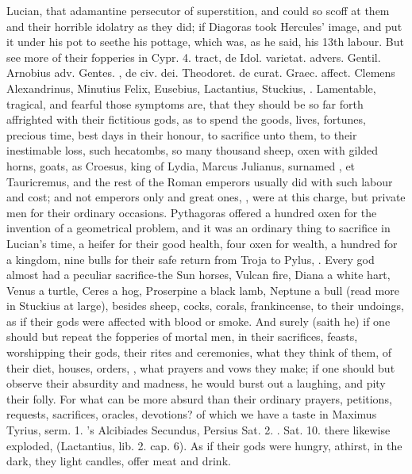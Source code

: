 {Lucian, that adamantine persecutor of superstition, and \Pliny{}
could so scoff at them and their horrible idolatry as they did; if
Diagoras took Hercules' image, and put it under his pot to seethe his
pottage, which was, as he said, his 13th labour. But see more of their
fopperies in Cypr. \textlatin{4. tract, de Idol. varietat}. \Chrysostom{} \textlatin{advers.
Gentil.} Arnobius \textlatin{adv. Gentes.} \Austin{}, \textlatin{de civ. dei. Theodoret. de curat.
Graec. affect.} Clemens Alexandrinus, Minutius Felix, Eusebius,
Lactantius, Stuckius, \etc{}. Lamentable, tragical, and fearful those
symptoms are, that they should be so far forth affrighted with their
fictitious gods, as to spend the goods, lives, fortunes, precious time,
best days in their honour, to sacrifice unto them, to their
inestimable loss, such hecatombs, so many thousand sheep, oxen with
gilded horns, goats, as Croesus, king of Lydia,  Marcus
Julianus, surnamed , et Tauricremus, and
the rest of the Roman emperors usually did with such labour and cost;
and not emperors only and great ones, , were at this
charge, but private men for their ordinary occasions. Pythagoras
offered a hundred oxen for the invention of a geometrical problem, and
it was an ordinary thing to sacrifice in Lucian's time, a heifer
for their good health, four oxen for wealth, a hundred for a kingdom,
nine bulls for their safe return from Troja to Pylus, \etc{}. Every god
almost had a peculiar sacrifice-the Sun horses, Vulcan fire, Diana a
white hart, Venus a turtle, Ceres a hog, Proserpine a black lamb,
Neptune a bull (read more in  Stuckius at large), besides sheep,
cocks, corals, frankincense, to their undoings, as if their gods were
affected with blood or smoke. And surely (saith he) if one should
but repeat the fopperies of mortal men, in their sacrifices, feasts,
worshipping their gods, their rites and ceremonies, what they think of
them, of their diet, houses, orders, \etc{}, what prayers and vows they
make; if one should but observe their absurdity and madness, he would
burst out a laughing, and pity their folly. For what can be more absurd
than their ordinary prayers, petitions, requests, sacrifices,
oracles, devotions? of which we have a taste in Maximus Tyrius, \textlatin{serm.
1.} \Plato's Alcibiades Secundus, Persius \textlatin{Sat. 2.} \Juvenal. \textlatin{Sat. 10.} there
likewise exploded,  (Lactantius, \textlatin{lib. 2. cap. 6}). As if their gods were
hungry, athirst, in the dark, they light candles, offer meat and drink.

}
